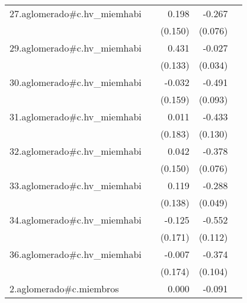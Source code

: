 {\begin{longtable}{l*{4}{D{.}{.}{-1}}}
\addlinespace
27.aglomerado#c.hv\_miemhabi&                     &       0.198         &      -0.267\sym{***}&                     \\
            &                     &     (0.150)         &     (0.076)         &                     \\
\addlinespace
29.aglomerado#c.hv\_miemhabi&                     &       0.431\sym{**} &      -0.027         &                     \\
            &                     &     (0.133)         &     (0.034)         &                     \\
\addlinespace
30.aglomerado#c.hv\_miemhabi&                     &      -0.032         &      -0.491\sym{***}&                     \\
            &                     &     (0.159)         &     (0.093)         &                     \\
\addlinespace
31.aglomerado#c.hv\_miemhabi&                     &       0.011         &      -0.433\sym{***}&                     \\
            &                     &     (0.183)         &     (0.130)         &                     \\
\addlinespace
32.aglomerado#c.hv\_miemhabi&                     &       0.042         &      -0.378\sym{***}&                     \\
            &                     &     (0.150)         &     (0.076)         &                     \\
\addlinespace
33.aglomerado#c.hv\_miemhabi&                     &       0.119         &      -0.288\sym{***}&                     \\
            &                     &     (0.138)         &     (0.049)         &                     \\
\addlinespace
34.aglomerado#c.hv\_miemhabi&                     &      -0.125         &      -0.552\sym{***}&                     \\
            &                     &     (0.171)         &     (0.112)         &                     \\
\addlinespace
36.aglomerado#c.hv\_miemhabi&                     &      -0.007         &      -0.374\sym{***}&                     \\
            &                     &     (0.174)         &     (0.104)         &                     \\
\addlinespace
2.aglomerado#c.miembros&                     &       0.000         &      -0.091\sym{***}&                     \\

\end{longtable}}
